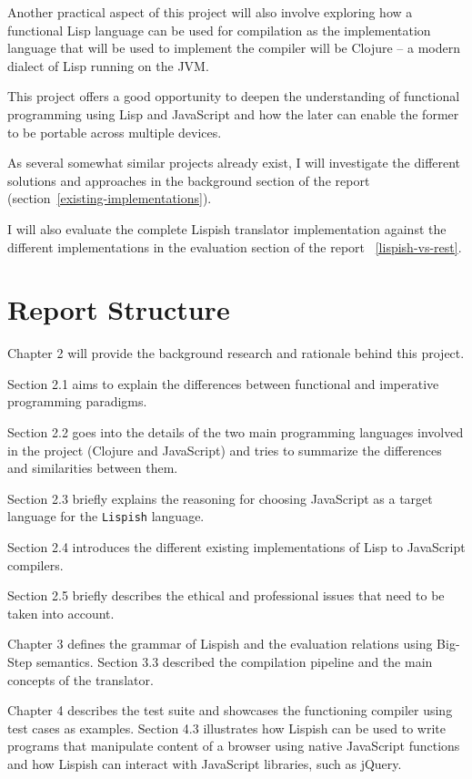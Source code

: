 \documentclass[11pt]{informatics-report}
\begin{document}
Another practical aspect of this project will also involve exploring how a functional Lisp language can be used for compilation as the implementation language that will be used to implement the compiler will be Clojure -- a modern dialect of Lisp running on the JVM.  

This project offers a good opportunity to deepen the understanding of functional programming using Lisp and JavaScript and how the later can enable the former to be portable across multiple devices.

As several somewhat similar projects already exist, I will investigate the different solutions and approaches in the background section of the report (section~\ref{existing-implementations}).

I will also evaluate the complete Lispish translator implementation against the different implementations in the evaluation section of the report ~\ref{lispish-vs-rest}.

\section{Report Structure}
Chapter 2 will provide the background research and rationale behind this project.

Section 2.1 aims to explain the differences between functional and imperative programming paradigms. 

Section 2.2 goes into the details of the two main programming languages involved in the project (Clojure and JavaScript) and tries to summarize the differences and similarities between them. 

Section 2.3 briefly explains the reasoning for choosing JavaScript as a target language for the \texttt{Lispish} language.

Section 2.4 introduces the different existing implementations of Lisp to JavaScript compilers.

Section 2.5 briefly describes the ethical and professional issues that need to be taken into account. 

Chapter 3 defines the grammar of Lispish and the evaluation relations using Big-Step semantics. Section 3.3 described the compilation pipeline and the main concepts of the translator.

Chapter 4 describes the test suite and showcases the functioning compiler using test cases as examples. Section 4.3 illustrates how Lispish can be used to write programs that manipulate content of a browser using native JavaScript functions and how Lispish can interact with JavaScript libraries, such as jQuery.
\end{document}
